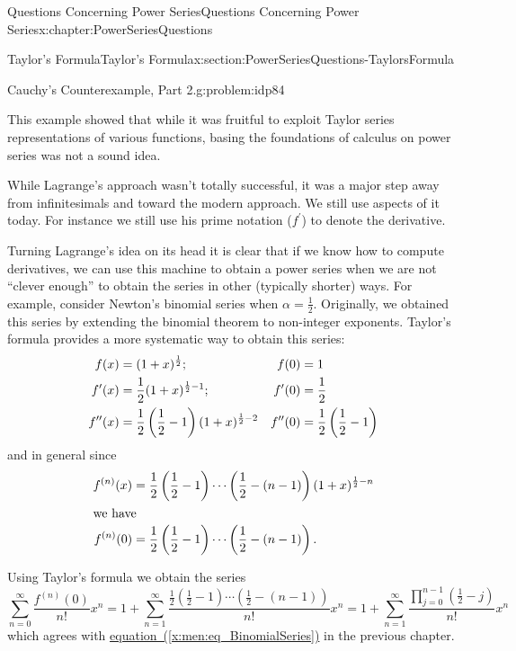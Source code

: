 \begin{chapterptx}{Questions Concerning Power Series}{}{Questions Concerning Power Series}{}{}{x:chapter:PowerSeriesQuestions}
\begin{sectionptx}{Taylor's Formula}{}{Taylor's Formula}{}{}{x:section:PowerSeriesQuestions-TaylorsFormula}
\begin{problem}{Cauchy's Counterexample, Part 2.}{g:problem:idp84}
\begin{enumerate}[font=\bfseries,label=(\alph*),ref=\alph*]
			\end{enumerate}
		\end{problem}
		This example showed that while it was fruitful to exploit Taylor series representations of various functions, basing the foundations of calculus on power series was not a sound idea.%
		\par
		While Lagrange's  approach wasn't totally successful, it was a major step away from infinitesimals and toward the modern approach. We still use aspects of it today. For instance we still use his prime notation (\(f^\prime\)) to denote the derivative.%
		\par
		Turning Lagrange's idea on its head it is clear that if we know how to compute derivatives, we can use this machine to obtain a power series when we are not ``clever enough'' to obtain the series in other (typically shorter) ways. For example, consider Newton's binomial series when \(\alpha=\frac{1}{2}\). Originally, we obtained this series by extending the binomial theorem to non-integer exponents. Taylor's formula provides a more systematic way to obtain this series:%
		\begin{align*}
			f(x)& =(1+x)^{\frac{1}{2}};& f(0)& =1\\
			f^\prime(x)& =\frac{1}{2}(1+x)^{\frac{1}{2}-1};&  f^\prime(0)& =\frac{1}{2}\\
			f^{\prime\prime}(x)& =\frac{1}{2}\left(\frac{1}{2}-1\right)(1+x)^{\frac{1}{2}-2}& f^{\prime\prime}(0)& =\frac{1}{2}\left(\frac{1}{2}-1\right)
		\end{align*}
		and in general since%
		\begin{align*}
			f^{(n)}(x)& =\frac{1}{2}\left(\frac{1}{2}-1\right)\cdots\left(\frac{1}{2}-(n-1)\right)(1+x)^{\frac{1}{2}-n}\\
			\intertext{we have}
			f^{(n)}(0)& =\frac{1}{2}\left(\frac{1}{2}-1\right)\cdots\left(\frac{1}{2}-(n-1)\right)\text{.}
		\end{align*}
		\par
		Using Taylor's formula we obtain the series%
		\begin{equation*}
			\sum_{n=0}^\infty\frac{f^{(n)}(0)}{n!}x^n = 1+\sum_{n=1}^\infty\frac{\frac{1}{2}\left(\frac{1}{2}-1\right)\cdots\left( \frac{1}{2}-(n-1)\right)}{n!}x^n= 1+\sum_{n=1}^\infty\frac{\prod_{j=0}^{n-1}\left(\frac{1}{2}-j\right)}{n!}x^n
		\end{equation*}
		which agrees with \hyperref[x:men:eq_BinomialSeries]{equation~({\xreffont\ref{x:men:eq_BinomialSeries}})} in the previous chapter.%

\end{sectionptx}
\end{chapterptx}
